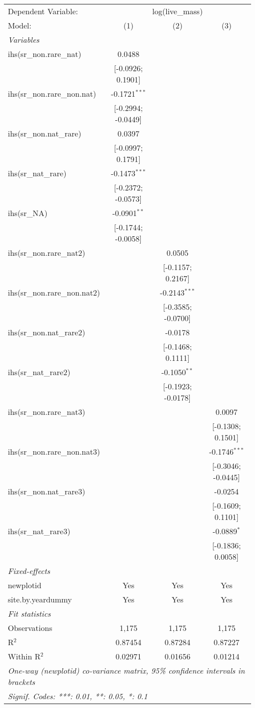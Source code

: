 \begin{tabular}{lccc}
\tabularnewline\midrule\midrule
Dependent Variable:&\multicolumn{3}{c}{log(live\_mass)}\\
Model:&(1) & (2) & (3)\\
\midrule \emph{Variables}&   &   &  \\
ihs(sr\_non.rare\_nat)&0.0488 &    &   \\
  &[-0.0926; 0.1901] &    &   \\
ihs(sr\_non.rare\_non.nat)&-0.1721$^{***}$ &    &   \\
  &[-0.2994; -0.0449] &    &   \\
ihs(sr\_non.nat\_rare)&0.0397 &    &   \\
  &[-0.0997; 0.1791] &    &   \\
ihs(sr\_nat\_rare)&-0.1473$^{***}$ &    &   \\
  &[-0.2372; -0.0573] &    &   \\
ihs(sr\_NA)&-0.0901$^{**}$ &    &   \\
  &[-0.1744; -0.0058] &    &   \\
ihs(sr\_non.rare\_nat2)&   & 0.0505 &   \\
  &   & [-0.1157; 0.2167] &   \\
ihs(sr\_non.rare\_non.nat2)&   & -0.2143$^{***}$ &   \\
  &   & [-0.3585; -0.0700] &   \\
ihs(sr\_non.nat\_rare2)&   & -0.0178 &   \\
  &   & [-0.1468; 0.1111] &   \\
ihs(sr\_nat\_rare2)&   & -0.1050$^{**}$ &   \\
  &   & [-0.1923; -0.0178] &   \\
ihs(sr\_non.rare\_nat3)&   &    & 0.0097\\
  &   &    & [-0.1308; 0.1501]\\
ihs(sr\_non.rare\_non.nat3)&   &    & -0.1746$^{***}$\\
  &   &    & [-0.3046; -0.0445]\\
ihs(sr\_non.nat\_rare3)&   &    & -0.0254\\
  &   &    & [-0.1609; 0.1101]\\
ihs(sr\_nat\_rare3)&   &    & -0.0889$^{*}$\\
  &   &    & [-0.1836; 0.0058]\\
\midrule \emph{Fixed-effects}&   &   &  \\
newplotid & Yes & Yes & Yes\\
site.by.yeardummy & Yes & Yes & Yes\\
\midrule \emph{Fit statistics}&  & & \\
Observations & 1,175&1,175&1,175\\
R$^2$ & 0.87454&0.87284&0.87227\\
Within R$^2$ & 0.02971&0.01656&0.01214\\
\midrule\midrule\multicolumn{4}{l}{\emph{One-way (newplotid) co-variance matrix, 95\% confidence intervals in brackets}}\\
\multicolumn{4}{l}{\emph{Signif. Codes: ***: 0.01, **: 0.05, *: 0.1}}\\
\end{tabular}


